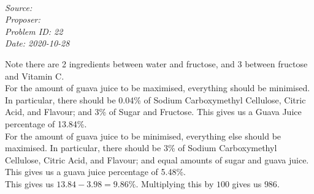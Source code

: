 \SSbreak\\
\emph{Source: \Cop}\\
\emph{Proposer: \Ptony}\\
\emph{Problem ID: 22}\\
\emph{Date: 2020-10-28}\\
\SSbreak

\bigskip

\begin{solution}\hfil\medskip

    Note there are 2 ingredients between water and fructose, and 3 between fructose and Vitamin C. \\

    For the amount of guava juice to be maximised, everything should be minimised. 
    In particular, there should be 0.04\% of Sodium Carboxymethyl Cellulose, Citric Acid, and Flavour; and 3\% of Sugar and Fructose. 
    This gives us a Guava Juice percentage of 13.84\%. \\

    For the amount of guava juice to be minimised, everything else should be maximised. 
    In particular, there should be 3\% of Sodium Carboxymethyl Cellulose, Citric Acid, and Flavour;
     and equal amounts of sugar and guava juice. 
    This gives us a guava juice percentage of 5.48\%. \\

    This gives us $13.84 - 3.98 = 9.86 \%$. 
    Multiplying this by $100$ gives us $\boxed{986}$. 
\end{solution}\bigskip